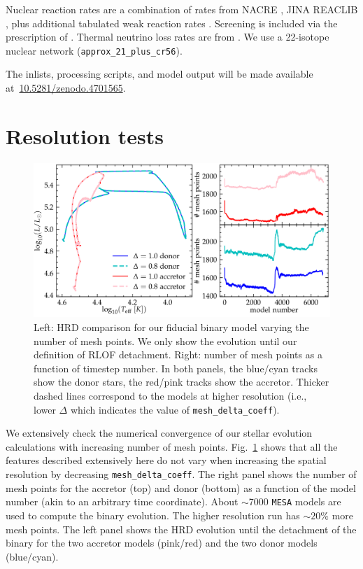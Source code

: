 \documentclass[twocolumn,twocolappendix,trackchanges]{aastex63}
\DeclareRobustCommand{\Figref}[1]{Fig.~\ref{#1}}
\begin{document}
Nuclear reaction rates are a combination of rates from NACRE
\citep{Angulo1999}, JINA REACLIB \citep{Cyburt2010}, plus additional
tabulated weak reaction rates \citet{Fuller1985, Oda1994,
  Langanke2000}. Screening is included via the prescription of
\citet{Chugunov2007}.  Thermal neutrino loss rates are from
\citet{Itoh1996}. We use a
22-isotope nuclear network (\texttt{approx\_21\_plus\_cr56}).

The inlists, processing scripts, and model output will be made available at~\url{10.5281/zenodo.4701565}.

\section{Resolution tests}
\label{sec:res_tests}


\begin{figure}[hp]
  \centering
  \includegraphics[width=\textwidth]{spatial_res_plot}
  \caption{Left: HRD comparison for our fiducial binary model varying
  the number of mesh points. We only show the evolution until our definition
  of RLOF detachment. Right: number of mesh points as a
  function of timestep number. In both panels, the blue/cyan tracks show the donor stars, the
red/pink tracks show the accretor. Thicker dashed lines correspond to
the models at higher resolution (i.e., lower $\Delta$ which indicates
the value of \texttt{mesh\_delta\_coeff}).}
\label{fig:sp_test}
\end{figure}



We extensively check the numerical convergence of our stellar
evolution calculations with increasing number of mesh
points. \Figref{fig:sp_test} shows that all the features described
extensively here do not vary when increasing the spatial resolution by
decreasing \texttt{mesh\_delta\_coeff}. The right panel shows the
number of mesh points for the accretor (top) and donor (bottom) as a
function of the model number (akin to an arbitrary time
coordinate). About $\sim$7000 \texttt{MESA} models are used to compute
the binary evolution. The higher resolution run has $\sim 20\%$ more
mesh points. The left panel shows the HRD evolution until the
detachment of the binary for the two accretor models (pink/red) and
the two donor models (blue/cyan).
\end{document}
